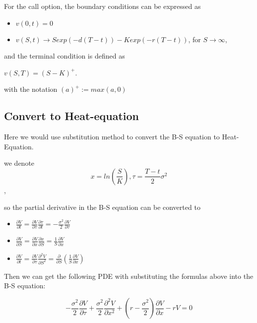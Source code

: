 \documentclass{article}
\begin{document}
For the call option, the boundary conditions can be expressed as
\begin{itemize}
\item$v(0, t) = 0$
\item$v(S, t) \rightarrow Sexp(-d(T-t))-Kexp(-r(T-t))$, for $S \rightarrow \infty$,
\end{itemize}
and the terminal condition is defined as
\begin{center}
$v(S,T) = (S -K)^+$.
\end{center}
with the notation $(a)^+ := max(a,0)$
\subsection{Convert to Heat-equation}
Here we would use substitution method to convert the B-S equation to Heat-Equation.

we denote
$$x = ln(\frac{S}{K}),  \tau = \frac{T-t}{2}\sigma^2$$,

so the partial derivative in the B-S equation can be converted to 
\begin{center}
\begin{itemize}
 
\item$\frac{\partial V}{\partial t} = \frac{\partial V}{\partial \tau}\frac{\partial \tau}{\partial t}  = -\frac{\sigma^2}{2} \frac{\partial V}{\partial \tau} $
 
\item$\frac{\partial V}{\partial S} = \frac{\partial V}{\partial x}\frac{\partial x}{\partial S}  = \frac{1}{S} \frac{\partial V}{\partial x} $
 
\item$\frac{\partial V}{\partial t} = \frac{\partial V}{\partial \tau}\frac{\partial^2 V}{\partial S^2}  = \frac{\partial }{\partial S}(\frac{1}{S} \frac{\partial V}{\partial x}) $ 
\end{itemize}
\end{center}

Then we can get the following PDE with substituting the formulas above into the B-S equation:

$$-\frac{\sigma^2}{2} \frac{\partial V}{\partial \tau} +\frac{\sigma^2}{2} \frac{\partial^2 V}{\partial x^2} + (r - \frac{\sigma^2}{2})\frac{\partial V}{\partial x}- rV = 0$$
\end{document}
